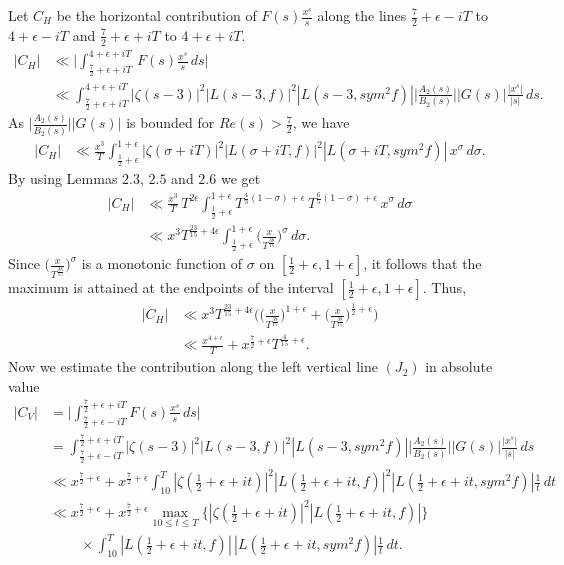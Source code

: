 \documentclass[preprint,12pt]{elsarticle}
\numberwithin{equation}{section}
\begin{document}
Let $C_{H}$ be the horizontal contribution of $F(s)\frac{x^{s}}{s}$ along the lines $\frac{7}{2}+\epsilon-iT$ to $4+\epsilon-iT$ and $\frac{7}{2}+\epsilon+iT$ to $4+\epsilon+iT$.
\begin{align*}
	|C_{H}|& \ll \Bigg|\int_{\frac{7}{2}+\epsilon+iT}^{4+\epsilon+iT}\,F(s)\frac{x^{s}}{s}\,ds\Bigg|\\
	&\ll \int_{\frac{7}{2}+\epsilon+iT}^{4+\epsilon+iT} |\zeta(s-3)|^{2}|L(s-3,f)|^{2}|L(s-3,sym^{2}f)|\Big|\frac{A_{2}(s)}{B_{2}(s)}\Big||G(s)|\frac{|x^{s}|}{|s|}\,ds.
\end{align*}
As $\Big|\frac{A_{2}(s)}{B_{2}(s)}\Big||G(s)|$ is bounded for $Re(s)>\frac{7}{2}$, we have
\begin{align*}
	|C_{H}|&\ll\frac{x^{3}}{T}\int_{\frac{1}{2}+\epsilon}^{1+\epsilon}|\zeta(\sigma+iT)|^{2}|L(\sigma+iT,f)|^{2}|L(\sigma+iT,sym^{2}f)|\,x^{\sigma}\,d\sigma.
\end{align*}
By using Lemmas $2.3$, $2.5$ and $2.6$ we get
\begin{align*}
	|C_{H}|& \ll \frac{x^{3}}{T}\,T^{2\epsilon}\int_{\frac{1}{2}+\epsilon}^{1+\epsilon} T^{\frac{4}{3}(1-\sigma)+\epsilon}\,T^{\frac{6}{5}(1-\sigma)+\epsilon}\,x^{\sigma}\,d\sigma\\
	&\ll x^{3}T^{\frac{23}{15}+4\epsilon}\int_{\frac{1}{2}+\epsilon}^{1+\epsilon} \Big(\frac{x}{T^{\frac{38}{15}}}\Big)^{\sigma}\, d\sigma.
\end{align*}
Since $\Big(\frac{x}{T^{\frac{38}{15}}}\Big)^{\sigma}$ is a monotonic function of $\sigma$ on $[\frac{1}{2}+\epsilon,1+\epsilon]$, it follows that the maximum is attained at the endpoints of the interval $[\frac{1}{2}+\epsilon,1+\epsilon]$. Thus,
\begin{align*}
	|C_{H}|&\ll x^{3}T^{\frac{23}{15}+4\epsilon} \Big(\Big(\frac{x}{T^{\frac{38}{15}}}\Big)^{1+\epsilon}+\Big(\frac{x}{T^{\frac{38}{15}}}\Big)^{\frac{1}{2}+\epsilon}\Big)\\
	& \ll \frac{x^{4+\epsilon}}{T}+x^{\frac{7}{2}+\epsilon}T^{\frac{4}{15}+\epsilon}.
\end{align*}
Now we estimate the contribution along the left vertical line $(J_{2})$ in absolute value
\begin{align*}
	|C_{V}|&=\Big|\int_{\frac{7}{2}+\epsilon-iT}^{\frac{7}{2}+\epsilon+iT} F(s)\frac{x^{s}}{s}\,ds\Big|\\
	&=\int_{\frac{7}{2}+\epsilon-iT}^{\frac{7}{2}+\epsilon+iT} |\zeta(s-3)|^{2}|L(s-3,f)|^{2}|L(s-3,sym^{2}f)|\Big|\frac{A_{2}(s)}{B_{2}(s)}\Big||G(s)|\frac{|x^{s}|}{|s|}\,ds\\
	&\ll x^{\frac{7}{2}+\epsilon}+x^{\frac{7}{2}+\epsilon}\int_{10}^{T} |\zeta(\frac{1}{2}+\epsilon+it)|^{2}|L(\frac{1}{2}+\epsilon+it,f)|^{2}|L(\frac{1}{2}+\epsilon+it,sym^{2}f)|\frac{1}{t}\,dt\\
	&\ll x^{\frac{7}{2}+\epsilon}+x^{\frac{7}{2}+\epsilon} \max_{10\leq t\leq T}\{|\zeta(\frac{1}{2}+\epsilon+it)|^{2}|L(\frac{1}{2}+\epsilon+it,f)|\}\\
	&~~~~~~~~~~\times \int_{10}^{T} |L(\frac{1}{2}+\epsilon+it,f)|\,|L(\frac{1}{2}+\epsilon+it,sym^{2}f)|\frac{1}{t}\,dt.
\end{align*}
\end{document}
